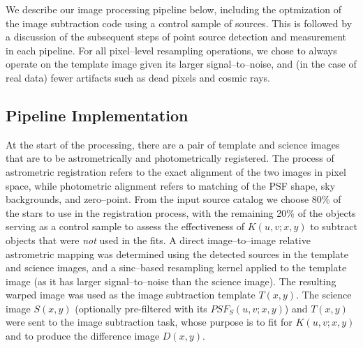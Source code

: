 \documentclass[floatfix, apj]{emulateapj}
\begin{document}
We describe our image processing pipeline below, including the optmization of the image subtraction code using a control sample of sources.
This is followed by a discussion of the subsequent steps of point source detection and measurement in each pipeline.
For all pixel--level resampling operations, we chose to always operate on the template image given its larger signal--to--noise, and (in the case of real data) fewer artifacts such as dead pixels and cosmic rays.

\subsection{Pipeline Implementation}

At the start of the processing, there are a pair of template and science images that are to be astrometrically and photometrically registered.
The process of astrometric registration refers to the exact alignment of the two images in pixel space, while photometric alignment refers to matching of the PSF shape, sky backgrounds, and zero--point.
From the input source catalog we choose 80\% of the stars to use in the registration process, with the remaining 20\% of the objects serving as a control sample to assess the effectiveness of $K(u,v;x,y)$ to subtract objects that were {\it not} used in the fits.
A direct image--to--image relative astrometric mapping was determined using the detected sources in the template and science images, and a sinc--based resampling kernel applied to the template image (as it has larger signal--to--noise than the science image).
The resulting warped image was used as the image subtraction template $T(x,y)$.
The science image $S(x,y)$ (optionally pre-filtered with its $PSF_S(u,v;x,y)$) and $T(x,y)$ were sent to the image subtraction task, whose purpose is to fit for $K(u,v;x,y)$ and to produce the difference image $D(x,y)$.
\end{document}
